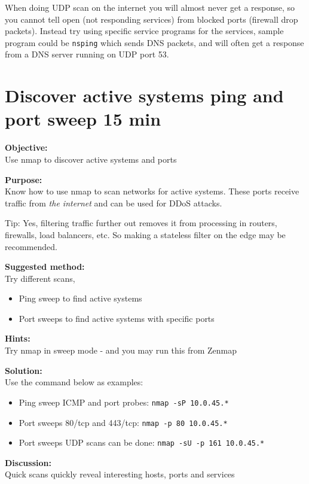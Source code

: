 \documentclass[a4paper,11pt,notitlepage]{report}
\begin{document}
When doing UDP scan on the internet you will almost never get a response, so you cannot tell open (not responding services) from blocked ports (firewall drop packets). Instead try using specific service programs for the services, sample program could be \verb+nsping+ which sends DNS packets, and will often get a response from a DNS server running on UDP port 53.


\chapter{Discover active systems ping and port sweep 15 min}
\label{ex:nmap-pingsweep}

{\bf Objective:}\\
Use nmap to discover active systems and ports

{\bf Purpose:}\\
Know how to use nmap to scan networks for active systems. These ports receive traffic from \emph{the internet} and can be used for DDoS attacks.

Tip: Yes, filtering traffic further out removes it from processing in routers, firewalls, load balancers, etc. So making a stateless filter on the edge may be recommended.

{\bf Suggested method:}\\
Try different scans,
\begin{itemize}
\item Ping sweep to find active systems
\item Port sweeps to find active systems with specific ports
\end{itemize}

{\bf Hints:} \\
Try nmap in sweep mode - and you may run this from Zenmap

{\bf Solution:}\\
Use the command below as examples:
\begin{itemize}
\item Ping sweep ICMP and port probes: \verb+nmap -sP 10.0.45.*+
\item Port sweeps 80/tcp and 443/tcp: \verb+nmap -p 80 10.0.45.*+
\item Port sweeps UDP scans can be done: \verb+nmap -sU -p 161 10.0.45.*+
\end{itemize}

{\bf Discussion:}\\
Quick scans quickly reveal interesting hosts, ports and services
\end{document}
